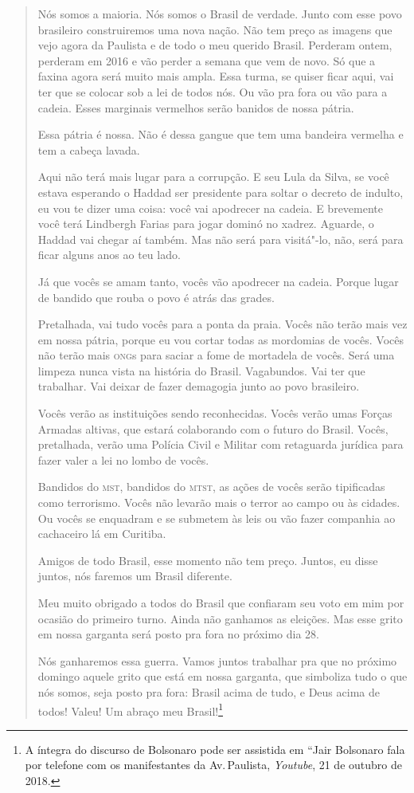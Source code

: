 \begin{quote}
Nós somos a maioria. Nós somos o Brasil de verdade. Junto com esse povo
brasileiro construiremos uma nova nação. Não tem preço as imagens que
vejo agora da Paulista e de todo o meu querido Brasil. Perderam ontem,
perderam em 2016 e vão perder a semana que vem de novo. Só que a faxina
agora será muito mais ampla. Essa turma, se quiser ficar aqui, vai ter
que se colocar sob a lei de todos nós. Ou vão pra fora ou vão para a
cadeia. Esses marginais vermelhos serão banidos de nossa pátria.

Essa pátria é nossa. Não é dessa gangue que tem uma bandeira vermelha e
tem a cabeça lavada.

Aqui não terá mais lugar para a corrupção. E seu Lula da Silva, se você
estava esperando o Haddad ser presidente para soltar o decreto de
indulto, eu vou te dizer uma coisa: você vai apodrecer na cadeia. E
brevemente você terá Lindbergh Farias para jogar dominó no xadrez.
Aguarde, o Haddad vai chegar aí também. Mas não será para visitá"-lo,
não, será para ficar alguns anos ao teu lado.

Já que vocês se amam tanto, vocês vão apodrecer na cadeia. Porque lugar
de bandido que rouba o povo é atrás das grades.

Pretalhada, vai tudo vocês para a ponta da praia. Vocês não terão mais
vez em nossa pátria, porque eu vou cortar todas as mordomias de vocês.
Vocês não terão mais \textsc{ong}s para saciar a fome de mortadela de vocês. Será
uma limpeza nunca vista na história do Brasil. Vagabundos. Vai ter que
trabalhar. Vai deixar de fazer demagogia junto ao povo brasileiro.

Vocês verão as instituições sendo reconhecidas. Vocês verão umas Forças
Armadas altivas, que estará colaborando com o futuro do Brasil. Vocês,
pretalhada, verão uma Polícia Civil e Militar com retaguarda jurídica
para fazer valer a lei no lombo de vocês.

Bandidos do \textsc{mst}, bandidos do \textsc{mtst}, as ações de vocês serão tipificadas
como terrorismo. Vocês não levarão mais o terror ao campo ou às cidades.
Ou vocês se enquadram e se submetem às leis ou vão fazer companhia ao
cachaceiro lá em Curitiba.

Amigos de todo Brasil, esse momento não tem preço. Juntos, eu disse
juntos, nós faremos um Brasil diferente.

Meu muito obrigado a todos do Brasil que confiaram seu voto em mim por
ocasião do primeiro turno. Ainda não ganhamos as eleições. Mas esse
grito em nossa garganta será posto pra fora no próximo dia 28.

Nós ganharemos essa guerra. Vamos juntos trabalhar pra que no próximo
domingo aquele grito que está em nossa garganta, que simboliza tudo o
que nós somos, seja posto pra fora: Brasil acima de tudo, e Deus acima
de todos! Valeu! Um abraço meu Brasil!\footnote{A íntegra do discurso de
  Bolsonaro pode ser assistida em ``Jair Bolsonaro fala por telefone com os manifestantes da Av.\,Paulista, \textit{Youtube}, 21 de outubro de 2018.}
\end{quote}

